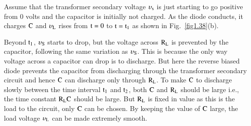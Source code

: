 Assume that the transformer secondary voltage $\upsilon_{\textrm{s}}$ is just starting to go positive from 0 volts and the capacitor is initially not charged. As the diode conducts, it charges $\textrm{C}$ and $\upsilon_{\textrm{L}}$ rises from $\textrm{t}=0$ to $\textrm{t}=\textrm{t}_{1}$ as shown in Fig.~\ref{fig1.38}(b).

Beyond $\textrm{t}_{1}$, $\upsilon_{\textrm{S}}$ starts to drop, but the voltage across $\textrm{R}_{\textrm{L}}$ is prevented by the capacitor, following the same variation as $\upsilon_{\textrm{S}}$. This is because the only way voltage across a capacitor can drop is to discharge. But here the reverse biased diode prevents the capacitor from discharging through the transformer secondary circuit and hence $\textrm{C}$ can discharge only through $\textrm{R}_{\textrm{L}}$. To make $\textrm{C}$ to discharge slowly between the time interval $\textrm{t}_{1}$ and $\textrm{t}_{2}$, both $\textrm{C}$ and $\textrm{R}_{\textrm{L}}$ should be large i.e., the time constant $\textrm{R}_{\textrm{L}}\textrm{C}$ should be large. But $\textrm{R}_{\textrm{L}}$ is fixed in value as this is the load to the circuit, only $\textrm{C}$ can be chosen. By keeping the value of $\textrm{C}$ large, the load voltage $\upsilon_{\textrm{L}}$ can be made extremely smooth.

